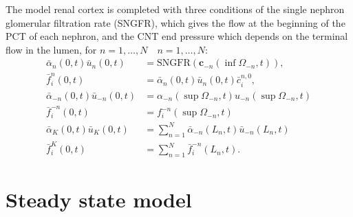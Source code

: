 \documentclass{article}
\begin{document}
The model renal cortex is completed with three conditions of the single nephron glomerular filtration rate (SNGFR), which gives the flow at the beginning of the PCT of each nephron, and the CNT end pressure which depends on the terminal flow in the lumen, for $n=1,\dots,N
\quad n=1,\dots,N$:
\begin{align}
    \bar{\alpha}_n (0,t)\bar{u}_n(0,t) &= \mathrm{SNGFR}\left( \mathbf{c}_{-n}\left( \inf \Omega_{-n},t \right) \right),\\
    \bar{f}_i^n (0,t) &= \bar{\alpha}_n (0,t)\bar{u}_n(0,t)\bar{c}_i^{n,0},\\
    \bar{\alpha}_{-n} (0,t)\bar{u}_{-n}(0,t) &= \alpha_{-n}(\sup \Omega_{-n},t)u_{-n}(\sup\Omega_{-n},t)\\
    \bar{f}_i^{-n} (0,t) &= f_{i}^{-n}(\sup\Omega_{-n},t)\\
    \bar{\alpha}_{K} (0,t)\bar{u}_{K}(0,t) &= \sum_{n=1}^N\bar{\alpha}_{-n}(L_n,t)\bar{u}_{-n}(L_n,t)\\
    \bar{f}_i^{K} (0,t) &= \sum_{n=1}^N \bar{f}_{i}^{-n}(L_n,t).
\end{align}

\section{Steady state model}
\end{document}
